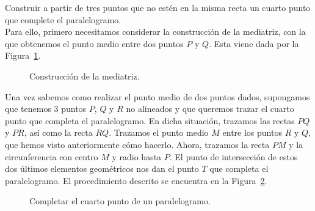 \begin{ejercicio}\label{ej:paralelogramo}
    Construir a partir de tres puntos que no estén en la misma recta un cuarto punto que complete el paralelogramo.\\

    \noindent
    Para ello, primero necesitamos considerar la construcción de la mediatriz, con la que obtenemos el punto medio entre dos puntos $P$ y $Q$. Esta viene dada por la Figura~\ref{fig:mediatriz}.
    \begin{figure}
        \centering
        \caption{Construcción de la mediatriz.}
        \label{fig:mediatriz}
    \end{figure}
    Una vez sabemos como realizar el punto medio de dos puntos dados, supongamos que tenemos 3 puntos $P$, $Q$ y $R$ no alineados y que queremos trazar el cuarto punto que completa el paralelogramo. En dicha situación, trazamos las rectas $PQ$ y $PR$, así como la recta $RQ$. Trazamos el punto medio $M$ entre los puntos $R$ y $Q$, que hemos visto anteriormente cómo hacerlo. Ahora, trazamos la recta $PM$ y la circunferencia con centro $M$ y radio hasta $P$. El punto de intersección de estos dos últimos elementos geométricos nos dan el punto $T$ que completa el paralelogramo. El procedimiento descrito se encuentra en la Figura~\ref{fig:paralelogramo}.
    \begin{figure}
        \centering
        \caption{Completar el cuarto punto de un paralelogramo.}
        \label{fig:paralelogramo}
    \end{figure}
\end{ejercicio}

